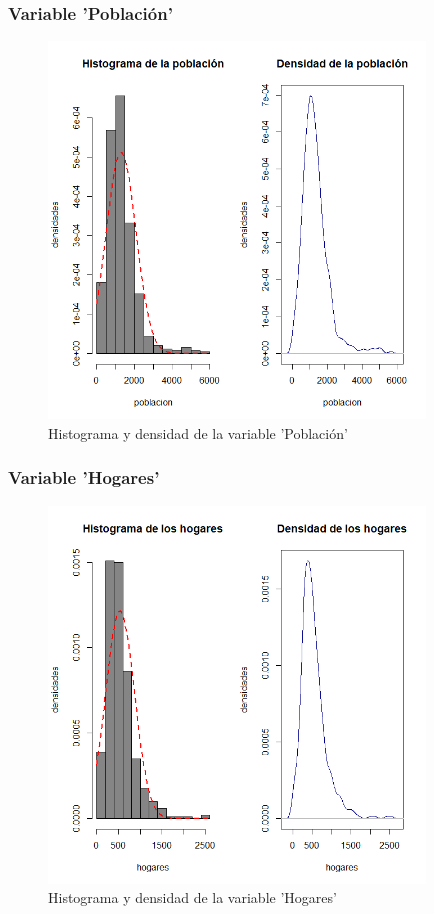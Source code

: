 \documentclass[12pt]{beamer}
\begin{document}
\begin{frame}
\frametitle{Variable 'Población'}
\begin{figure}[!h]
    \begin{center}
        \includegraphics[width=10cm]{imagenes/6.png}
        \caption{Histograma y densidad de la variable 'Población'}
        \label{fig:Densidad}
    \end{center}
\end{figure}
\end{frame}

\begin{frame}
\frametitle{Variable 'Hogares'}
\begin{figure}[!h]
    \begin{center}
        \includegraphics[width=10cm]{imagenes/7.png}
        \caption{Histograma y densidad de la variable 'Hogares'}
        \label{fig:Densidad}
    \end{center}
\end{figure}
\end{frame}
\end{document}
